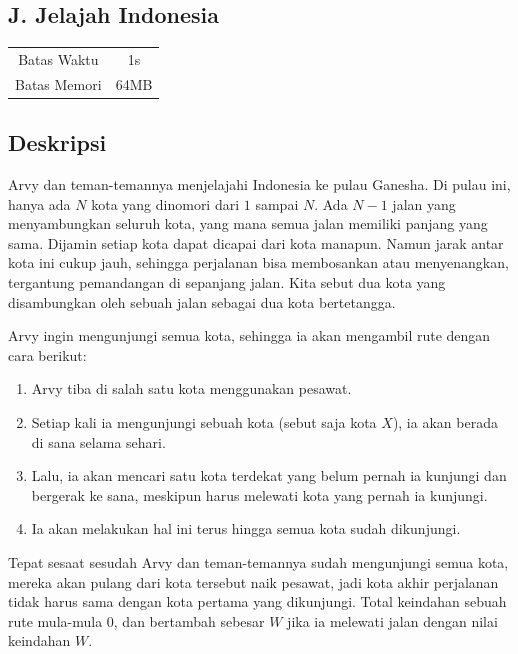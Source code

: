 \documentclass{article}
\begin{document}
\begin{center}
    \section*{J. Jelajah Indonesia} %

    \begin{tabular}{ | c c | }
        \hline
        Batas Waktu  & 1s \\    %
        Batas Memori & 64MB \\  %
        \hline
    \end{tabular}
\end{center}

\subsection*{Deskripsi}

Arvy dan teman-temannya menjelajahi Indonesia ke pulau Ganesha.
Di pulau ini, hanya ada $N$ kota yang dinomori dari $1$ sampai $N$.
Ada $N - 1$ jalan yang menyambungkan seluruh kota, yang mana semua jalan memiliki panjang yang sama.
Dijamin setiap kota dapat dicapai dari kota manapun.
Namun jarak antar kota ini cukup jauh, sehingga perjalanan bisa membosankan atau menyenangkan, tergantung pemandangan di sepanjang jalan.
Kita sebut dua kota yang disambungkan oleh sebuah jalan sebagai dua kota bertetangga.

Arvy ingin mengunjungi semua kota, sehingga ia akan mengambil rute dengan cara berikut:
\begin{enumerate}
    \item Arvy tiba di salah satu kota menggunakan pesawat.
    \item Setiap kali ia mengunjungi sebuah kota (sebut saja kota $X$), ia akan berada di sana selama sehari.
    \item Lalu, ia akan mencari satu kota terdekat yang belum pernah ia kunjungi dan bergerak ke sana, meskipun harus melewati kota yang pernah ia kunjungi.
    \item Ia akan melakukan hal ini terus hingga semua kota sudah dikunjungi.
\end{enumerate}
Tepat sesaat sesudah Arvy dan teman-temannya sudah mengunjungi semua kota, mereka akan pulang dari kota tersebut naik pesawat, jadi kota akhir perjalanan tidak harus sama dengan kota pertama yang dikunjungi.
Total keindahan sebuah rute mula-mula 0, dan bertambah sebesar $W$ jika ia melewati jalan dengan nilai keindahan $W$.
\end{document}
